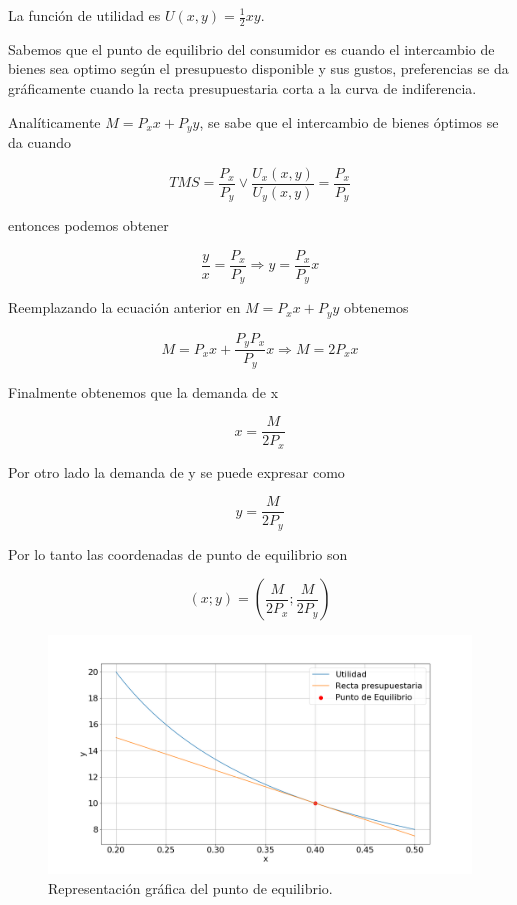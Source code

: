 \documentclass[letterpaper]{article}
\begin{document}
La función de utilidad es $U(x,y)=\frac{1}{2}xy$.

Sabemos que el punto de equilibrio del consumidor es cuando el intercambio de
bienes sea optimo según el presupuesto disponible y sus gustos, preferencias
se da gráficamente cuando la recta presupuestaria corta a la curva de indiferencia.

Analíticamente $M=P_xx+P_yy$, se sabe que el intercambio de bienes óptimos
se da cuando

\begin{equation}
TMS = \frac{P_x}{P_y} \lor \frac{U_x(x,y)}{U_y(x,y)}=\frac{P_x}{P_y} 
\end{equation}

entonces podemos obtener 

\begin{equation}
\frac{y}{x}=\frac{P_x}{P_y} \Rightarrow y=\frac{P_x}{P_y}x
\end{equation}

Reemplazando la ecuación anterior en $M=P_xx+P_yy$ obtenemos 

\begin{equation}
M=P_xx+\frac{P_yP_x}{P_y}x \Rightarrow M=2P_xx
\end{equation}

Finalmente obtenemos que la demanda de x

\begin{equation}
x=\frac{M}{2P_x}
\end{equation}

Por otro lado la demanda de y se puede expresar como 

\begin{equation}
y=\frac{M}{2P_y}
\end{equation}

Por lo tanto las coordenadas de punto de equilibrio son

\begin{equation}
(x;y)=\left( \frac{M}{2P_x} ; \frac{M}{2P_y} \right)
\end{equation}

\begin{figure}[h]
\centering
\includegraphics[width=\textwidth]{./Images/punto_6.png}
\caption{Representación gráfica del punto de equilibrio.}
\end{figure}
\end{document}
